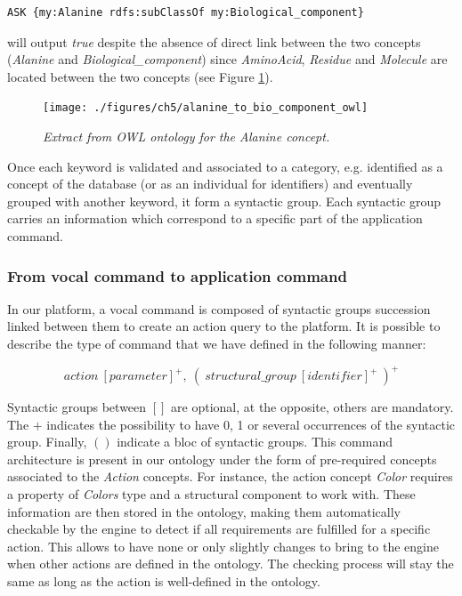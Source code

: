\documentclass{vgtc}                          %
\begin{document}
\begin{lstlisting}[language=XML]
ASK {my:Alanine rdfs:subClassOf my:Biological_component}
\end{lstlisting}
\noindent
will output \textit{true} despite the absence of direct link between the two concepts (\textit{Alanine} and \textit{Biological\_component}) since \textit{AminoAcid}, \textit{Residue} and \textit{Molecule} are located between the two concepts (see Figure \ref{Fig:alanine_owl}).

\hspace{1cm}

\begin{figure}[!htb]
  \centering
  {\texttt{[image: ./figures/ch5/alanine\_to\_bio\_component\_owl]}}
    \caption[Extract from OWL ontology for the \textit{Alanine} concept.]{\it Extract from OWL ontology for the \textit{Alanine} concept.}
  \label{Fig:alanine_owl}
\end{figure}

Once each keyword is validated and associated to a category, e.g. identified as a concept of the database (or as an individual for identifiers) and eventually grouped with another keyword, it form a syntactic group. Each syntactic group carries an information which correspond to a specific part of the application command.

\subsubsection{From vocal command to application command}

In our platform, a vocal command is composed of syntactic groups succession linked between them to create an action query to the platform. It is possible to describe the type of command that we have defined in the following manner:

$$action\ [parameter]^+,\ (\ structural\_group\ [identifier]^+\ )^+$$

Syntactic groups between $[]$ are optional, at the opposite, others are mandatory. The $+$ indicates the possibility to have 0, 1 or several occurrences of the syntactic group. Finally, $()$ indicate a bloc of syntactic groups. This command architecture is present in our ontology under the form of pre-required concepts associated to the \textit{Action} concepts. For instance, the action concept \textit{Color} requires a property of \textit{Colors} type and a structural component to work with. These information are then stored in the ontology, making them automatically checkable by the engine to detect if all requirements are fulfilled for a specific action. This allows to have none or only slightly changes to bring to the engine when other actions are defined in the ontology. The checking process will stay the same as long as the action is well-defined in the ontology.
\end{document}
